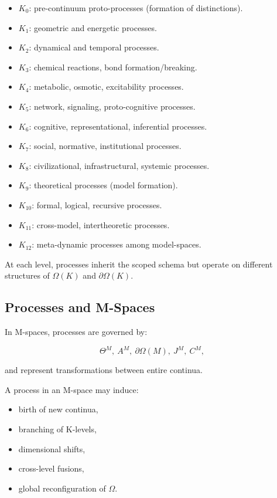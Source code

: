 \begin{itemize}
    \item $K_0$: pre-continuum proto-processes (formation of distinctions).
    \item $K_1$: geometric and energetic processes.
    \item $K_2$: dynamical and temporal processes.
    \item $K_3$: chemical reactions, bond formation/breaking.
    \item $K_4$: metabolic, osmotic, excitability processes.
    \item $K_5$: network, signaling, proto-cognitive processes.
    \item $K_6$: cognitive, representational, inferential processes.
    \item $K_7$: social, normative, institutional processes.
    \item $K_8$: civilizational, infrastructural, systemic processes.
    \item $K_9$: theoretical processes (model formation).
    \item $K_{10}$: formal, logical, recursive processes.
    \item $K_{11}$: cross-model, intertheoretic processes.
    \item $K_{12}$: meta-dynamic processes among model-spaces.
\end{itemize}

At each level, processes inherit the scoped schema but operate on
different structures of $\Omega(K)$ and $\partial\Omega(K)$.

\subsection{Processes and M-Spaces}

In M-spaces, processes are governed by:

\[
\Theta^M,\ 
A^M,\ 
\partial\Omega(M),\ 
J^M,\ 
C^M,
\]

and represent transformations between entire continua.  

A process in an M-space may induce:

\begin{itemize}
    \item birth of new continua,
    \item branching of K-levels,
    \item dimensional shifts,
    \item cross-level fusions,
    \item global reconfiguration of $\Omega$.
\end{itemize}

